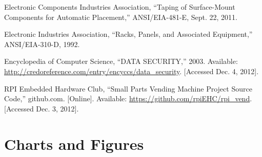 \documentclass[12pt,oneside,final]{article}
\begin{document}


\begin{thebibliography}{1}


   Electronic Components Industries Association, ``Taping of Surface-Mount Components for Automatic Placement,'' ANSI/EIA-481-E, Sept. 22, 2011.

   Electronic Industries Association, ``Racks, Panels, and Associated Equipment,'' ANSI/EIA-310-D, 1992.

   Encyclopedia of Computer Science, ``DATA SECURITY,'' 2003. Available: \url{http://credoreference.com/entry/encyccs/data_security}. [Accessed Dec. 4, 2012].

   RPI Embedded Hardware Club, ``Small Parts Vending Machine Project Source Code,'' github.com. [Online]. Available: \url{https://github.com/rpiEHC/rpi_vend}. [Accessed Dec. 3, 2012].

\end{thebibliography}


\section{Charts and Figures}
\end{document}
